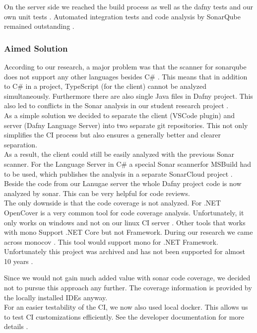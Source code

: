 On the server side we reached the build process as well as the dafny tests and our own unit tests \cite{sa}.
Automated integration tests and code analysis by SonarQube remained outstanding \cite{sa}.

\subsubsection{Aimed Solution}
According to our research, a major problem was that the scanner for sonarqube does not support any other languages besides C\# \cite{sonar-supports-only-one-language}.
This means that in addition to C\# in a project, TypeScript (for the client) cannot be analyzed simultaneously.
Furthermore there are also single Java files in Dafny project.
This also led to conflicts in the Sonar analysis in our student research project \cite{sa}. \\

As a simple solution we decided to separate the client (VSCode plugin) and server (Dafny Language Server) into two separate git repositories.
This not only simplifies the CI process but also ensures a generally better and clearer separation. \\

As a result, the client could still be easily analyzed with the previous Sonar scanner.
For the Language Server in C\# a special Sonar scannerfor MSBuild had to be used, which publishes the analysis in a separate SonarCloud project \cite{dev}.
Beside the code from our Lanugae server the whole Dafny project code is now analyzed by sonar.
This can be very helpful for code reviews. \\

The only downside is that the code coverage is not analyzed.
For .NET OpenCover is a very common tool for code coverage analysis.
Unfortunately, it only works on windows and not on our linux CI server \cite{opencover}.
Other tools that works with mono Support .NET Core but not Framework.
During our research we came across monocov \cite{monocov}. This tool would support mono for .NET Framework. Unfortunately this project was archived and has not been supported for almost 10 years \cite{monocov}.

Since we would not gain much added value with sonar code coverage, we decided not to pursue this approach any further. The coverage information is provided by the locally installed IDEs anyway.
\\

For an easier testability of the CI, we now also used local docker. This allows us to test CI customizations efficiently. See the developer documentation for more details \cite{dev}. \\

